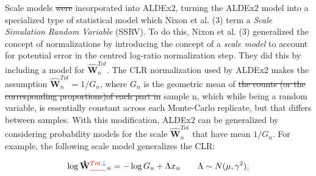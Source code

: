 \documentclass[
]{article}
\providecommand{\DIFadd}[1]{{\protect\color{blue}\uwave{#1}}} %
\providecommand{\DIFdel}[1]{{\protect\color{red}\sout{#1}}}                      %
\providecommand{\DIFaddbegin}{} %
\providecommand{\DIFaddend}{} %
\providecommand{\DIFdelbegin}{} %
\providecommand{\DIFdelend}{} %
\newcommand{\DIFscaledelfig}{0.5}
\newlength{\DIFdelgraphicswidth} %
\newlength{\DIFdelgraphicsheight} %
\newcommand{\DIFaddincludegraphics}[2][]{{\color{blue}\fbox{\DIFOincludegraphics[#1]{#2}}}} %
\newcommand{\DIFdelincludegraphics}[2][]{%
\sbox{\DIFdelgraphicsbox}{\DIFOincludegraphics[#1]{#2}}%
\settoboxwidth{\DIFdelgraphicswidth}{\DIFdelgraphicsbox} %
\settoboxtotalheight{\DIFdelgraphicsheight}{\DIFdelgraphicsbox} %
\scalebox{\DIFscaledelfig}{%
\parbox[b]{\DIFdelgraphicswidth}{\usebox{\DIFdelgraphicsbox}\\[-\baselineskip] \rule{\DIFdelgraphicswidth}{0em}}\llap{\resizebox{\DIFdelgraphicswidth}{\DIFdelgraphicsheight}{%
\setlength{\unitlength}{\DIFdelgraphicswidth}%
\begin{picture}(1,1)%
\thicklines\linethickness{2pt} %
{\color[rgb]{1,0,0}\put(0,0){\framebox(1,1){}}}%
{\color[rgb]{1,0,0}\put(0,0){\line( 1,1){1}}}%
{\color[rgb]{1,0,0}\put(0,1){\line(1,-1){1}}}%
\end{picture}%
}\hspace*{3pt}}} %
} %
\DeclareRobustCommand{\DIFaddbegin}{\DIFOaddbegin \let\includegraphics\DIFaddincludegraphics} %
\DeclareRobustCommand{\DIFaddend}{\DIFOaddend \let\includegraphics\DIFOincludegraphics} %
\DeclareRobustCommand{\DIFdelbegin}{\DIFOdelbegin \let\includegraphics\DIFdelincludegraphics} %
\DeclareRobustCommand{\DIFdelend}{\DIFOaddend \let\includegraphics\DIFOincludegraphics} %
\begin{document}
Scale models \DIFdelbegin \DIFdel{were }\DIFdelend \DIFaddbegin \DIFadd{can be }\DIFaddend incorporated into ALDEx2, turning the ALDEx2 model
into a specialized type of statistical model which Nixon et al. (3) term
a \textit{Scale Simulation Random   Variable} (SSRV). To do this, Nixon
et al. (3) generalized the concept of normalizations by introducing the
concept of a \textit{scale model} to account for potential error in the
centred log-ratio normalization step. They did this by including a model
for \DIFdelbegin \DIFdel{\(\mathbf{\hat{W}}^{Tot}_{n}\)}\DIFdelend \DIFaddbegin \DIFadd{\(\mathbf{\hat{W}}^{\perp}_{n}\)}\DIFaddend . The CLR normalization used by
ALDEx2 makes the assumption \DIFdelbegin \DIFdel{\(\mathbf{\hat{W}}^{Tot}_{n}=1/G_{n}\)}\DIFdelend \DIFaddbegin \DIFadd{\(\mathbf{\hat{W}}^{\perp}_{n}=1/G_{n}\)}\DIFaddend ,
where \(G_n\) is the geometric mean of \DIFdelbegin \DIFdel{the counts (or the corresponding
proportions)of each part in }\DIFdelend sample n, which while being a
random variable, is essentially constant across each Monte-Carlo
replicate, but that differs between samples. With this modification,
ALDEx2 can be generalized by considering probability models for the
scale \DIFdelbegin \DIFdel{\(\mathbf{\hat{W}}^{Tot}_{n}\) }\DIFdelend \DIFaddbegin \DIFadd{\(\mathbf{\hat{W}}^{\perp}_{n}\) }\DIFaddend that have mean \(1/G_{n}\). For
example, the following scale model generalizes the CLR:

\[\log \mathbf{\hat{W}}\DIFdelbegin \DIFdel{^{Tot}}\DIFdelend \DIFaddbegin \DIFadd{^{\perp}}\DIFaddend _{n} = -\log G_{n} + \Lambda x_{n} \qquad \Lambda
\sim N(\mu, \gamma^{2})\DIFdelbegin \DIFdel{.}\DIFdelend \]\DIFaddbegin \DIFadd{.
}\DIFaddend 
\end{document}
